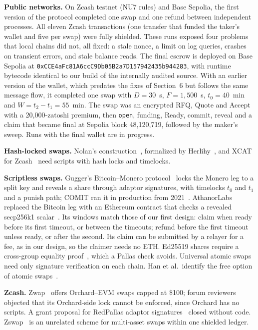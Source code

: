 \documentclass[10pt,letterpaper]{article}
\makeatletter
\renewcommand\section{\@startsection{section}{1}{\z@}{-1.3em}{0.45em}{\normalfont\large\bfseries}}
\theoremstyle{plain}
\theoremstyle{definition}
\newcommand{\fn}[1]{\texttt{#1}}
\makeatother
\begin{document}
\textbf{Public networks.} On Zcash testnet (NU7 rules) and Base Sepolia, the first version of the
protocol completed one swap and one refund between independent processes. All eleven Zcash
transactions (one transfer that funded the taker's wallet and five per swap) were fully
shielded. These runs exposed four problems that local chains did not, all
fixed: a stale nonce, a limit on log queries, crashes on transient errors, and stale balance reads.
The final escrow is deployed on Base Sepolia at
\texttt{0xCCE4aFc81A6ccC9Db05B2a7D157942435b944283}, with runtime bytecode identical to our build
of the internally audited source. With an earlier version of the wallet, which predates the fixes of
Section~6 but follows the same message flow, it completed one swap with $D=30$~s,
$F=1{,}500$~s, $t_0=40$~min and $W=t_2-t_1=55$~min. The swap was an encrypted RFQ, Quote and
Accept with a 20{,}000-zatoshi premium, then \fn{open}, funding, Ready, commit, reveal and a
claim that became final at Sepolia block 48{,}120{,}719, followed by the maker's sweep. Runs with
the final wallet are in progress.

\section{Related Work}

\textbf{Hash-locked swaps.} Nolan's construction~\cite{nolan}, formalized by
Herlihy~\cite{herlihy}, and XCAT for Zcash~\cite{xcat} need scripts with hash locks and timelocks.

\textbf{Scriptless swaps.} Gugger's Bitcoin--Monero protocol~\cite{gugger} locks the Monero leg to
a split key and reveals a share through adaptor signatures, with timelocks $t_0$ and $t_1$ and a
punish path; COMIT ran it in production from 2021~\cite{comit}. AthanorLabs replaced the Bitcoin
leg with an Ethereum contract that checks a revealed secp256k1 scalar~\cite{athanor}. Its windows
match those of our first design: claim when ready before its first timeout, or between the
timeouts; refund before the first timeout unless ready, or after the second. Its claim can be submitted by a relayer for a fee, as in our design, so the claimer
needs no ETH. Ed25519 shares require a cross-group equality
proof~\cite{mrl10}, which a Pallas check avoids. Universal atomic swaps~\cite{uas} need only
signature verification on each chain. Han et al.\ identify the free option of atomic
swaps~\cite{optionality}.

\textbf{Zcash.} Zwap~\cite{zwap} offers Orchard--EVM swaps capped at \$100; forum reviewers
objected that its Orchard-side lock cannot be enforced, since Orchard has no scripts. A grant
proposal for RedPallas adaptor signatures~\cite{zswap} closed without code. Zswap~\cite{zswappets}
is an unrelated scheme for multi-asset swaps within one shielded ledger.
\end{document}
